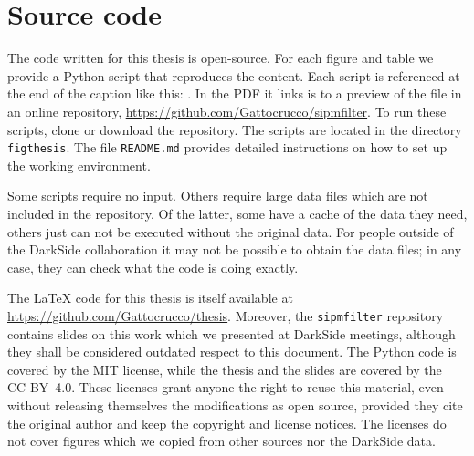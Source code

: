 \chapter{Source code}
\label{ch:code}

The code written for this thesis is open-source. For each figure and table we
provide a Python script that reproduces the content. Each script is referenced
at the end of the caption like this: . In the PDF it
links is to a preview of the file in an online repository,
\url{https://github.com/Gattocrucco/sipmfilter}. To run these scripts, clone or
download the repository. The scripts are located in the directory
\nolinkurl{figthesis}. The file \nolinkurl{README.md} provides detailed
instructions on how to set up the working environment.

Some scripts require no input. Others require large data files which are not
included in the repository. Of the latter, some have a cache of the data they
need, others just can not be executed without the original data. For people
outside of the DarkSide collaboration it may not be possible to obtain the data
files; in any case, they can check what the code is doing exactly.

The \LaTeX{} code for this thesis is itself available at
\url{https://github.com/Gattocrucco/thesis}. Moreover, the
\nolinkurl{sipmfilter} repository contains slides on this work which we
presented at DarkSide meetings, although they shall be considered outdated
respect to this document. The Python code is covered by the MIT license, while
the thesis and the slides are covered by the CC-BY~4.0. These licenses grant
anyone the right to reuse this material, even without releasing themselves the
modifications as open source, provided they cite the original author and keep
the copyright and license notices. The licenses do not cover figures which we
copied from other sources nor the DarkSide data.
